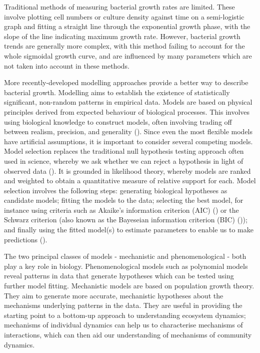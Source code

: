 \documentclass[11pt]{article}
\begin{document}
	Traditional methods of measuring bacterial growth rates are limited. These involve plotting cell numbers or culture density against time on a semi-logistic graph and fitting a straight line through the exponential growth phase, with the slope of the line indicating maximum growth rate. However, bacterial growth trends are generally more complex, with this method failing to account for the whole sigmoidal growth curve, and are influenced by many parameters which are not taken into account in these methods. 
	
	More recently-developed modelling approaches provide a better way to describe bacterial growth. Modelling aims to establish the existence of statistically significant, non-random patterns in empirical data. Models are based on physical principles derived from expected behaviour of biological processes. This involves using biological knowledge to construct models, often involving trading off between realism, precision, and generality (\cite{levins1966strategy}). Since even the most flexible models have artificial assumptions, it is important to consider several competing models. Model selection replaces the traditional null hypothesis testing approach often used in science, whereby we ask whether we can reject a hypothesis in light of observed data (\cite{johnson2004model}). It is grounded in likelihood theory, whereby models are ranked and weighted to obtain a quantitative measure of relative support for each. Model selection involves the following steps: generating biological hypotheses as candidate models; fitting the models to the data; selecting the best model, for instance using criteria such as Akaike's information criterion (AIC) (\cite{akaike1998information}) or the Schwarz criterion (also known as the Bayeseian information criterion (BIC) (\cite{schwarz1978estimating})); and finally using the fitted model(s) to estimate parameters to enable us to make predictions (\cite{johnson2004model}).	
	
	The two principal classes of models - mechanistic and phenomenological - both play a key role in biology. Phenomenological models such as polynomial models reveal patterns in data that generate hypotheses which can be tested using further model fitting. Mechanistic models are based on population growth theory. They aim to generate more accurate, mechanistic hypotheses about the mechanisms underlying patterns in the data. They are useful in providing the starting point to a bottom-up approach to understanding ecosystem dynamics; mechanisms of individual dynamics can help us to characterise mechanisms of interactions, which can then aid our understanding of mechanisms of community dynamics.
	
\end{document}
